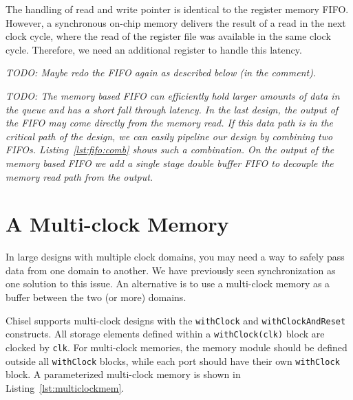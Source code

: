 \documentclass[%
    10pt,
    headinclude, footexclude,
    openright, %
    notitlepage,
    cleardoubleempty,
    headsepline,
    pointlessnumbers,
    bibtotoc, idxtotoc,
    ]{scrbook}
\newcommand{\code}[1]{{\lstinline[basicstyle=\small\ttfamily]{#1}}}
\newcommand{\todo}[1]{{\emph{TODO: #1}}}
\begin{document}
The handling of read and write pointer is identical to the register memory
FIFO. However, a synchronous on-chip memory delivers the result of a read
in the next clock cycle, where the read of the register file was available in the
same clock cycle.
Therefore, we need an additional register to handle this latency.

\todo{Maybe redo the FIFO again as described below (in the comment).}

\todo{
The memory based FIFO can efficiently hold larger amounts of data in the queue
and has a short fall through latency. In the last design, the output of the FIFO may
come directly from the memory read. If this data path is in the critical path of the design,
we can easily pipeline our design by combining two FIFOs. Listing~\ref{lst:fifo:comb}
shows such a combination. On the output of the memory based FIFO we add a single
stage double buffer FIFO to decouple the memory read path from the output.}


\section{A Multi-clock Memory}

In large designs with multiple clock domains, you may need a way to safely
pass data from one domain to another. We have previously seen synchronization as
one solution to this issue. An alternative is to use a multi-clock memory as
a buffer between the two (or more) domains.


Chisel supports multi-clock designs with the \code{withClock} and
\code{withClockAndReset} constructs. All storage elements defined within a
\code{withClock(clk)} block are clocked by \code{clk}. For multi-clock memories,
the memory module should be defined outside all \code{withClock} blocks, while
each port should have their own \code{withClock} block. A parameterized
multi-clock memory is shown in Listing~\ref{lst:multiclockmem}.
\end{document}
